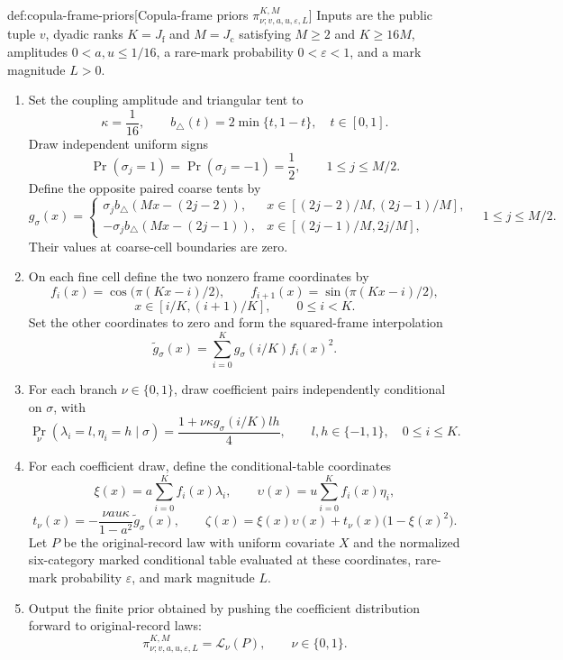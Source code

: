 \documentclass[11pt]{article}
\begin{document}
\begin{algorithmv}{def:copula-frame-priors}[Copula-frame priors \(\pi^{K,M}_{\nu;v,a,u,\varepsilon,L}\)]
Inputs are the public tuple \(v\), dyadic ranks \(K=J_{\mathrm f}\) and \(M=J_{\mathrm c}\) satisfying \(M\ge2\) and \(K\ge16M\), amplitudes \(0<a,u\le1/16\), a rare-mark probability \(0<\varepsilon<1\), and a mark magnitude \(L>0\).
\begin{enumerate}
\item Set the coupling amplitude and triangular tent to
\[
\kappa=\frac1{16},
\qquad
b_\triangle(t)=2\min\{t,1-t\},
\quad t\in[0,1].
\]
Draw independent uniform signs
\[
\Pr(\sigma_j=1)=\Pr(\sigma_j=-1)=\frac12,
\qquad 1\le j\le M/2.
\]
Define the opposite paired coarse tents by
\[
g_\sigma(x)=
\begin{cases}
\sigma_j b_\triangle(Mx-(2j-2)),
&x\in[(2j-2)/M,(2j-1)/M],\\
-\sigma_j b_\triangle(Mx-(2j-1)),
&x\in[(2j-1)/M,2j/M],
\end{cases}
\quad 1\le j\le M/2.
\]
Their values at coarse-cell boundaries are zero.
\item On each fine cell define the two nonzero frame coordinates by
\[
f_i(x)=\cos\!\bigl(\pi(Kx-i)/2\bigr),
\qquad
f_{i+1}(x)=\sin\!\bigl(\pi(Kx-i)/2\bigr),
\]
\[
x\in[i/K,(i+1)/K],
\qquad 0\le i<K.
\]
Set the other coordinates to zero and form the squared-frame interpolation
\[
\widetilde g_\sigma(x)
=
\sum_{i=0}^{K}g_\sigma(i/K)f_i(x)^2.
\]
\item For each branch \(\nu\in\{0,1\}\), draw coefficient pairs independently conditional on \(\sigma\), with
\[
\Pr_\nu(\lambda_i=l,\eta_i=h\mid\sigma)
=
\frac{1+\nu\kappa g_\sigma(i/K)lh}{4},
\qquad
l,h\in\{-1,1\},
\quad 0\le i\le K.
\]
\item For each coefficient draw, define the conditional-table coordinates
\[
\xi(x)=a\sum_{i=0}^{K}f_i(x)\lambda_i,
\qquad
\upsilon(x)=u\sum_{i=0}^{K}f_i(x)\eta_i,
\]
\[
t_\nu(x)=
-\frac{\nu au\kappa}{1-a^2}\widetilde g_\sigma(x),
\qquad
\zeta(x)=
\xi(x)\upsilon(x)+t_\nu(x)\bigl(1-\xi(x)^2\bigr).
\]
Let \(P\) be the original-record law with uniform covariate \(X\) and the normalized six-category marked conditional table evaluated at these coordinates, rare-mark probability \(\varepsilon\), and mark magnitude \(L\).
\item Output the finite prior obtained by pushing the coefficient distribution forward to original-record laws:
\[
\pi^{K,M}_{\nu;v,a,u,\varepsilon,L}
=
\mathcal L_\nu(P),
\qquad \nu\in\{0,1\}.
\]
\end{enumerate}
\end{algorithmv}
\end{document}
